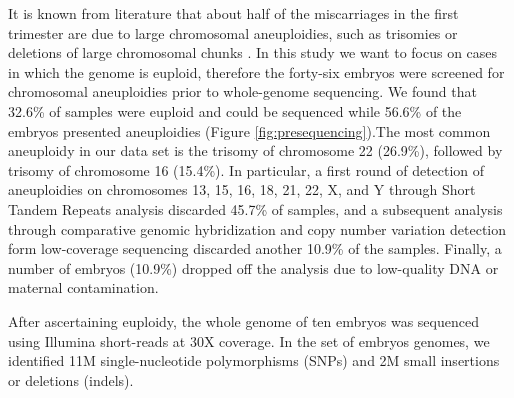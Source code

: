 It is known from literature that about half of the miscarriages in the first trimester are due to large chromosomal aneuploidies, such as trisomies or deletions of large chromosomal chunks \cite{pmid22796359}. In this study we want to focus on cases in which the genome is euploid, therefore the forty-six embryos were screened for chromosomal aneuploidies prior to whole-genome sequencing. We found that 32.6\% of samples were euploid and could be sequenced while 56.6\% of the embryos presented aneuploidies (Figure \ref{fig:presequencing}).The most common aneuploidy in our data set is the trisomy of chromosome 22 (26.9\%), followed by trisomy of chromosome 16 (15.4\%). In particular, a first round of detection of aneuploidies on chromosomes 13, 15, 16, 18, 21, 22, X, and Y through Short Tandem Repeats analysis discarded 45.7\% of samples, %
and a subsequent analysis through comparative genomic hybridization and copy number variation detection form low-coverage sequencing discarded another 10.9\% of the samples. Finally, a number of embryos (10.9\%) dropped off the analysis due to low-quality DNA or maternal contamination. 

After ascertaining euploidy, %
the whole genome of ten embryos was sequenced using Illumina short-reads at 30X coverage. In the set of embryos genomes, we identified 11M single-nucleotide polymorphisms (SNPs) and 2M small insertions or deletions (indels).%


